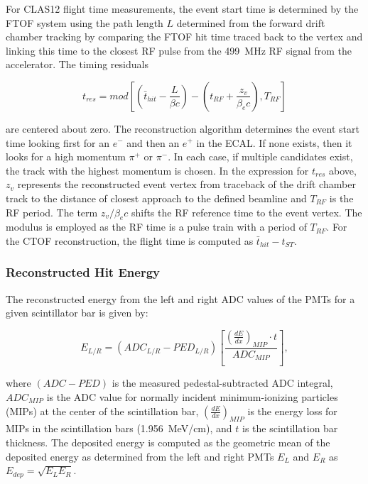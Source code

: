 \documentclass{elsart}
\begin{document}
For CLAS12 flight time measurements, the event start time is determined by the FTOF system using the
path length $L$ determined from the forward drift chamber tracking by comparing the FTOF hit time
traced back to the vertex and linking this time to the closest RF pulse from the 499~MHz RF signal from
the accelerator. The timing residuals

\begin{equation}
  t_{res} = mod \left [ \left (\bar{t}_{hit} - \frac{L}{\beta c} \right) - \left (t_{RF} + \frac{z_v}{\beta_e c} \right),
    T_{RF} \right ]
\end{equation}

\noindent
are centered about zero. The reconstruction algorithm determines the event start time looking first for an
$e^-$ and then an $e^+$ in the ECAL. If none exists, then it looks for a high momentum $\pi^+$ or $\pi^-$. In
each case, if multiple candidates exist, the track with the highest momentum is chosen. In the expression for
$t_{res}$ above, $z_v$ represents the reconstructed event vertex from traceback of the drift chamber track
to the distance of closest approach to the defined beamline and $T_{RF}$ is the RF period. The term
$z_v/\beta_e c$ shifts the RF reference time to the event vertex. The modulus is employed as the RF time is a
pulse train with a period of $T_{RF}$. For the CTOF reconstruction, the flight time is computed as
$\bar{t}_{hit} - t_{ST}$.

\subsubsection{Reconstructed Hit Energy}
\label{rec:energy}

The reconstructed energy from the left and right ADC values of the PMTs for a given scintillator bar is given by:

\begin{equation}
E_{L/R} = (ADC_{L/R} - PED_{L/R}) \left [ \frac{\left( \frac{dE}{dx} \right )_{MIP} \cdot t}{ADC_{MIP}} \right ],
\end{equation}

\noindent
where $(ADC  - PED)$ is the measured pedestal-subtracted ADC integral, $ADC_{MIP}$ is the ADC value for normally
incident minimum-ionizing particles (MIPs) at the center of the scintillation bar, $\left( \frac{dE}{dx} \right)_{MIP}$
is the energy loss for MIPs in the scintillation bars (1.956~MeV/cm), and $t$ is the scintillation bar thickness.
The deposited energy is computed as the geometric mean of the deposited energy as determined from the left and
right PMTs $E_L$ and $E_R$ as $E_{dep} = \sqrt{E_L E_R}$.
\end{document}
